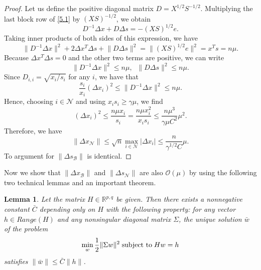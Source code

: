 \documentclass[a4paper,10 pt,titlepage,twoside]{book}
\theoremstyle{plain}
\newtheorem{lem}[thm]{Lemma}
\theoremstyle{definition}
\theoremstyle{remark}
\begin{document}
\begin{proof}
	Let us define the positive diagonal matrix $D = X^{1/2}S^{-1/2}$. Multiplying the last block row of \ref{5.1} by $(XS)^{-1/2}$, we obtain 
	\begin{equation*}
	D^{-1}\Delta x + D \Delta s = -(XS)^{1/2}e.
	\end{equation*}
	Taking inner products of both sides of this expression, we have
	\begin{equation*}
	\lVert D^{-1}\Delta x \rVert^{2} + 2\Delta x^{T}\Delta s+ \lVert D\Delta s \rVert^{2}= \lVert(XS)^{1/2}e\rVert^{2}= x^{T}s= n\mu.
	\end{equation*}
	Because $\Delta x^{T}\Delta s= 0$ and the other two terms are positive, we can write
	\begin{equation*}
	\lVert D^{-1}\Delta x\rVert^{2}\leq n\mu, \;\;\lVert D\Delta s\rVert^{2}\leq n\mu.
	\end{equation*}
	Since $D_{i,i}= \sqrt{x_{i}/s_{i}}$ for any $i$, we have that
	\begin{equation*}
	\frac{s_{i}}{x_{i}}(\Delta x_{i})^{2}\leq\lVert D^{-1}\Delta x\rVert^{2}\leq n\mu.
	\end{equation*}
	Hence, choosing $i\in\mathcal{N}$ and using $x_{i}s_{i}\geq\gamma\mu$, we find
	\begin{equation*}
	(\Delta x_{i})^{2}\leq\frac{n\mu x_{i}}{s_{i}}=\frac{n\mu x_{i}^{2}}{x_{i}s_{i}}\leq\frac{n\mu^{3}}{\gamma\mu C^{2}}\mu^{2}.
	\end{equation*}
	Therefore, we have 
	\begin{equation*}
	\lVert \Delta x_{\mathcal{N}}\rVert \leq \sqrt{n}\max\limits_{i \in \mathcal{N}}|\Delta x_{i}|\leq\frac{n}{\gamma^{1/2}C}\mu.
	\end{equation*}
	To argument for $\lVert \Delta s_{\mathcal{B}}\rVert$ is identical.
\end{proof}
Now we show that $\lVert \Delta x_{\mathcal{B}}\rVert$ and $\lVert \Delta s_{\mathcal{N}}\rVert$ are also $\mathcal{O}(\mu)$ by using the following two technical lemmas and an important theorem.
\begin{lem} \label{(T)}
	Let the matrix $H\in\mathbb{R}^{p,q}$ be given. Then there exists a nonnegative constant $\bar{C}$ depending only on $H$ with the following property: for any vector $h\in Range(H)$ and any nonsingular diagonal matrix $\Sigma$, the unique solution $\bar{w}$ of the problem
	\begin{align*}
	\min\limits_{w}\frac{1}{2}\lVert\Sigma w\rVert^{2} \text{\;subject to\;} Hw = h
	\end{align*}
	satisfies $\lVert\bar{w}\rVert\leq \bar{C}\lVert h\rVert$.
\end{lem}
\end{document}
